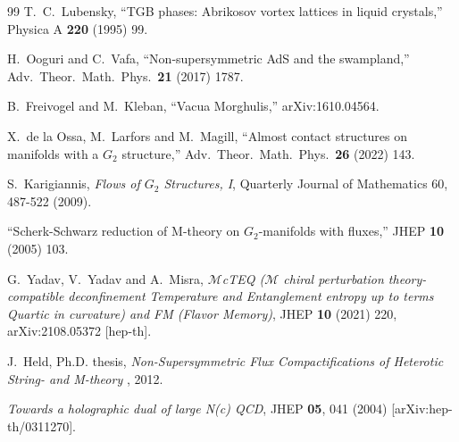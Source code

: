 \documentclass[a4paper,11pt,fleqn]{article}
\theoremstyle{plain}
\theoremstyle{definition}
\begin{document}
\begin{thebibliography}{99}
T.~C.~Lubensky,
``TGB phases: Abrikosov vortex lattices in liquid crystals,''
Physica A {\bf 220} (1995) 99.

H.~Ooguri and C.~Vafa,
``Non-supersymmetric AdS and the swampland,''
Adv.\ Theor.\ Math.\ Phys.\ {\bf 21} (2017) 1787.

B.~Freivogel and M.~Kleban,
``Vacua Morghulis,''
arXiv:1610.04564.

X.~de la Ossa, M.~Larfors and M.~Magill,
``Almost contact structures on manifolds with a $G_2$ structure,''
Adv.\ Theor.\ Math.\ Phys.\ {\bf 26} (2022) 143.

S.~Karigiannis, {\it Flows of $G_2$ Structures, I}, Quarterly Journal of Mathematics 60, 487-522 (2009).

``Scherk-Schwarz reduction of M-theory on $G_2$-manifolds with fluxes,''
JHEP {\bf 10} (2005) 103.



G.~Yadav, V.~Yadav and A.~Misra, {\it $\mathscr {M}$cTEQ ($\mathscr {M}$ chiral perturbation theory-compatible deconfinement Temperature and Entanglement entropy up to terms Quartic in curvature) and FM (Flavor Memory)},  JHEP {\bf 10} (2021) 220, arXiv:2108.05372 [hep-th].


J.~Held, Ph.D. thesis, {\it Non-Supersymmetric Flux Compactifications of Heterotic String- and M-theory} , 2012.

{\it Towards a holographic dual of large N(c) QCD}, JHEP {\bf 05}, 041 (2004) [arXiv:hep-th/0311270].



\end{thebibliography}
\end{document}
